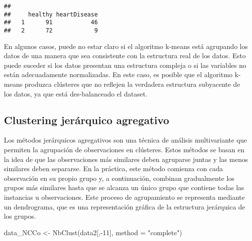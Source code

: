 \documentclass[
]{article}
\newenvironment{Shaded}{\begin{snugshade}}{\end{snugshade}}
\newcommand{\AttributeTok}[1]{\textcolor[rgb]{0.77,0.63,0.00}{#1}}
\newcommand{\DecValTok}[1]{\textcolor[rgb]{0.00,0.00,0.81}{#1}}
\newcommand{\FunctionTok}[1]{\textcolor[rgb]{0.00,0.00,0.00}{#1}}
\newcommand{\NormalTok}[1]{#1}
\newcommand{\OtherTok}[1]{\textcolor[rgb]{0.56,0.35,0.01}{#1}}
\newcommand{\SpecialCharTok}[1]{\textcolor[rgb]{0.00,0.00,0.00}{#1}}
\newcommand{\StringTok}[1]{\textcolor[rgb]{0.31,0.60,0.02}{#1}}
\begin{document}
\begin{Shaded}
\end{Shaded}

\begin{verbatim}
##    
##     healthy heartDisease
##   1      91           46
##   2      72            9
\end{verbatim}

En algunos casos, puede no estar claro si el algoritmo k-means está
agrupando los datos de una manera que sea consistente con la estructura
real de los datos. Esto puede suceder si los datos presentan una
estructura compleja o si las variables no están adecuadamente
normalizadas. En este caso, es posible que el algoritmo k-means produzca
clústeres que no reflejen la verdadera estructura subyacente de los
datos, ya que está des-balanceado el dataset.

\hypertarget{clustering-jeruxe1rquico-agregativo}{%
\subsection{Clustering jerárquico
agregativo}\label{clustering-jeruxe1rquico-agregativo}}

Los métodos jerárquicos agregativos son una técnica de análisis
multivariante que permiten la agrupación de observaciones en clústeres.
Estos métodos se basan en la idea de que las observaciones más similares
deben agruparse juntas y las menos similares deben separarse. En la
práctica, este método comienza con cada observación en su propio grupo
y, a continuación, combinan gradualmente los grupos más similares hasta
que se alcanza un único grupo que contiene todas las instancias u
observaciones. Este proceso de agrupamiento se representa mediante un
dendrograma, que es una representación gráfica de la estructura
jerárquica de los grupos.~

\begin{Shaded}
\begin{Highlighting}[]
\NormalTok{data\_NCCo }\OtherTok{\textless{}{-}} \FunctionTok{NbClust}\NormalTok{(data2[,}\SpecialCharTok{{-}}\DecValTok{11}\NormalTok{], }\AttributeTok{method =} \StringTok{"complete"}\NormalTok{)}
\end{Highlighting}
\end{Shaded}
\end{document}
